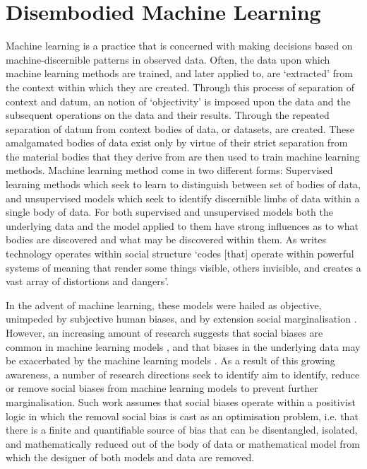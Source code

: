\section{Disembodied Machine Learning}
Machine learning is a practice that is concerned with making decisions based on machine-discernible patterns in observed data. Often, the data upon which machine learning methods are trained, and later applied to, are `extracted' from the context within which they are created. Through this process of separation of context and datum, an notion of `objectivity' is imposed upon the data and the subsequent operations on the data and their results. Through the repeated separation of datum from context bodies of data, or datasets, are created. These amalgamated bodies of data exist only by virtue of their strict separation from the material bodies that they derive from are then used to train machine learning methods. Machine learning method come in two different forms: Supervised learning methods which seek to learn to distinguish between set of bodies of data, and unsupervised models which seek to identify discernible limbs of data within a single body of data. For both supervised and unsupervised models both the underlying data and the model applied to them have strong influences as to what bodies are discovered and what may be discovered within them. As \cite{Benjamin:2019} writes technology operates within social structure `codes [that] operate within powerful systems of meaning that render some things visible, others invisible, and creates a vast array of distortions and dangers'.\vspace{5mm}

In the advent of machine learning, these models were hailed as objective, unimpeded by subjective human biases, and by extension social marginalisation \cite{Oneill:2016}. However, an increasing amount of research suggests that social biases are common in machine learning models \cite{Shah:2020,Buolamwini:2018,Agarwal:2018}, and that biases in the underlying data may be exacerbated by the machine learning models \cite{Zhao:2017,Jia:2020}. As a result of this growing awareness, a number of research directions seek to identify \cite{Shah:2020,Bender-Friedman:2018,Mitchell:2019,Buolamwini:2018} aim to identify, reduce or remove social biases \cite{Zhao:2017,Agarwal:2018,Romanov:2019,Jia:2020} from machine learning models to prevent further marginalisation. Such work assumes that social biases operate within a positivist logic in which the removal social bias is cast as an optimisation problem, i.e. that there is a finite and quantifiable source of bias that can be disentangled, isolated, and mathematically reduced out of the body of data or mathematical model from which the designer of both models and data are removed.

